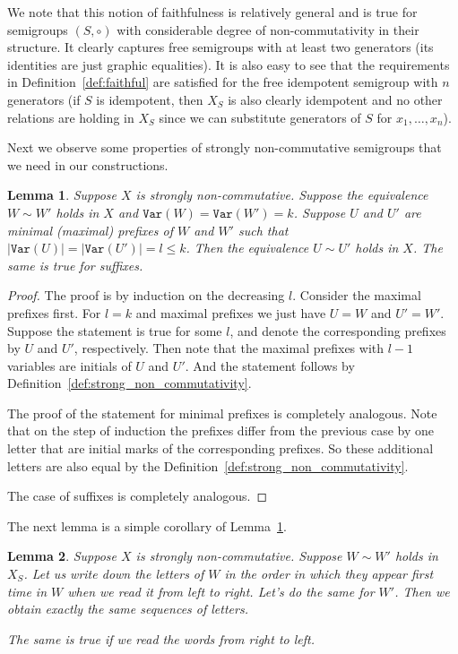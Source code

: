 \documentclass[11pt,letterpaper]{article}
\newtheorem{lemma}{Lemma}
\newcommand{\var}{\texttt{Var}}
\begin{document}
We note that this notion of faithfulness is relatively general and is true for
semigroups $(S,\circ)$ with considerable degree of non-commutativity in their
structure. It clearly captures free semigroups with at least two generators
(its identities are just graphic equalities). It is also easy to see that the
requirements in Definition~\ref{def:faithful} are satisfied for the free
idempotent semigroup with $n$ generators (if $S$ is idempotent, then $X_S$ is also
clearly idempotent and no other relations are holding in $X_S$ since we can
substitute generators of $S$ for $x_1, \ldots, x_n$).

Next we observe some properties of strongly non-commutative semigroups that we
need in our constructions.

\begin{lemma} \label{lem:prefix_equivalence}
Suppose $X$ is strongly non-commutative. Suppose the equivalence $W \sim W'$
holds in $X$ and $\var(W)=\var(W')=k$. Suppose $U$ and $U'$ are minimal
(maximal) prefixes of $W$ and $W'$ such that $|\var(U)| = |\var(U')| = l\leq k$.
Then the equivalence $U \sim U'$ holds in $X$. The same is true for suffixes.
\end{lemma}

\begin{proof}
The proof is by induction on the decreasing $l$. Consider the maximal prefixes
first. For $l=k$ and maximal prefixes we just have $U=W$ and $U'=W'$. Suppose
the statement is true for some $l$, and denote the corresponding prefixes by $U$
and $U'$, respectively. Then note that the maximal prefixes with $l-1$ variables
are initials of $U$ and $U'$. And the statement follows by
Definition~\ref{def:strong_non_commutativity}.

The proof of the statement for minimal prefixes is completely analogous. Note
that on the step of induction the prefixes differ from the previous case by one
letter that are initial marks of the corresponding prefixes. So these additional
letters are also equal by the Definition~\ref{def:strong_non_commutativity}.

The case of suffixes is completely analogous.
\end{proof}

The next lemma is a simple corollary of Lemma~\ref{lem:prefix_equivalence}.
\begin{lemma} \label{lem:variables_order}
Suppose $X$ is strongly non-commutative. Suppose $W \sim W'$ holds in $X_S$. Let us write down the letters of $W$ in the order in which they appear first time in $W$ when we read it from left to right. Let's do the same for $W'$. Then we obtain exactly the same sequences of letters.

The same is true if we read the words from right to left.
\end{lemma}
\end{document}
